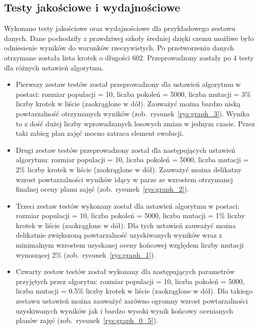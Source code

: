 	\subsection{Testy jakościowe i wydajnościowe}
	Wykonano testy jakościowe oraz wydajnościowe dla przykładowego zestawu danych. Dane pochodziły z prawdziwej szkoły średniej dzięki czemu możliwe było odniesienie wyników do warunków rzeczywistych. Po przetworzeniu danych otrzymane została lista krotek o długości 602. Przeprowadzony zostały po 4 testy dla różnych ustawień algorytmu. 
\begin{itemize}
	\item Pierwszy zestaw testów został przeprowadzony dla ustawień algorytmu w postaci: rozmiar populacji = 10, liczba pokoleń = 5000, liczba mutacji = 3\% liczby krotek w liście (zaokrąglone w dół). Zauważyć można bardzo niską powtarzalność otrzymanych wyników (zob.~rysunek~\ref{rys:graph_3}). Wynika to z dość dużej liczby wprowadzanych losowych zmian w jednym czasie. Przez taki zabieg plan zajęć mocno zatraca element ewolucji. 
	\newpage
	\item Drugi zestaw testów przeprowadzony został dla następujących ustawień algorytmu: rozmiar populacji = 10, liczba pokoleń = 5000, liczba mutacji = 2\% liczby krotek w liście (zaokrąglone w dół). Zauważyć można delikatny wzrost powtarzalności wyników idący w parze ze wzrostem otrzymanej finalnej oceny planu zajęć (zob.~rysunek~\ref{rys:graph_2}). 
	\item Trzeci zestaw testów wykonany został dla ustawień algorytmu w postaci: rozmiar populacji = 10, liczba pokoleń = 5000, liczba mutacji = 1\% liczby krotek w liście (zaokrąglone w dół). Dla tych ustawień zauważyć można delikatnie zwiększoną powtarzalność uzyskiwanych wyników wraz z minimalnym wzrostem uzyskanej oceny końcowej względem liczby mutacji wynoszącej 2\% (zob.~rysunek~\ref{rys:graph_1}). 
	\item Czwarty zestaw testów został wykonany dla następujących parametrów przyjętych przez algorytm:  rozmiar populacji = 10, liczba pokoleń = 5000, liczba mutacji = 0.5\% liczby krotek w liście (zaokrąglone w dół). Dla takiego zestawu ustawień można zauważyć zarówno ogromny wzrost powtarzalności uzyskiwanych wyników jak i bardzo wysoki wynik końcowy ocenianych planów zajęć (zob.~rysunek~\ref{rys:graph_0_5}). 
\end{itemize}
	
